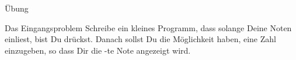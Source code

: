 \begin{frame}{Übung}

\begin{block}{Das Eingangsproblem}
\vspace{2pt}
Schreibe ein kleines Programm, dass solange Deine Noten einliest, bist Du  drückst. Danach sollst Du die Möglichkeit haben, eine Zahl  einzugeben, so dass Dir die -te Note angezeigt wird. 
\end{block}	
	
\end{frame}

	




